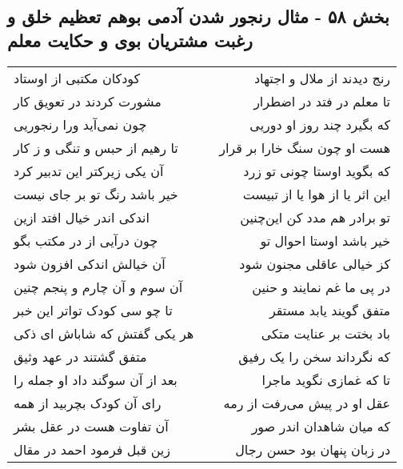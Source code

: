 \begin{center}
\section*{بخش ۵۸ - مثال رنجور شدن آدمی بوهم تعظیم خلق  و رغبت مشتریان بوی و حکایت معلم}
\label{sec:sh058}
\begin{longtable}{l p{0.5cm} r}
کودکان مکتبی از اوستاد
&&
رنج دیدند از ملال و اجتهاد
\\
مشورت کردند در تعویق کار
&&
تا معلم در فتد در اضطرار
\\
چون نمی‌آید ورا رنجوریی
&&
که بگیرد چند روز او دوریی
\\
تا رهیم از حبس و تنگی و ز کار
&&
هست او چون سنگ خارا بر قرار
\\
آن یکی زیرکتر این تدبیر کرد
&&
که بگوید اوستا چونی تو زرد
\\
خیر باشد رنگ تو بر جای نیست
&&
این اثر یا از هوا یا از تبیست
\\
اندکی اندر خیال افتد ازین
&&
تو برادر هم مدد کن این‌چنین
\\
چون درآیی از در مکتب بگو
&&
خیر باشد اوستا احوال تو
\\
آن خیالش اندکی افزون شود
&&
کز خیالی عاقلی مجنون شود
\\
آن سوم و آن چارم و پنجم چنین
&&
در پی ما غم نمایند و حنین
\\
تا چو سی کودک تواتر این خبر
&&
متفق گویند یابد مستقر
\\
هر یکی گفتش که شاباش ای ذکی
&&
باد بختت بر عنایت متکی
\\
متفق گشتند در عهد وثیق
&&
که نگرداند سخن را یک رفیق
\\
بعد از آن سوگند داد او جمله را
&&
تا که غمازی نگوید ماجرا
\\
رای آن کودک بچربید از همه
&&
عقل او در پیش می‌رفت از رمه
\\
آن تفاوت هست در عقل بشر
&&
که میان شاهدان اندر صور
\\
زین قبل فرمود احمد در مقال
&&
در زبان پنهان بود حسن رجال
\\
\end{longtable}
\end{center}
